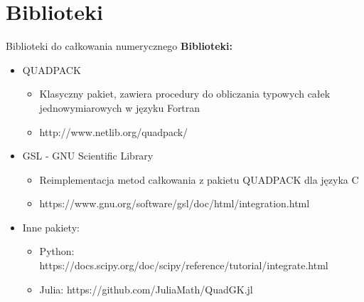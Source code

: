  \section{Biblioteki}
 
  \begin{frame}{Biblioteki do całkowania numerycznego}
      \textbf{Biblioteki:}
      
      \begin{itemize}
     	 \item QUADPACK
          	\begin{itemize}
          		\item Klasyczny pakiet, zawiera procedury do obliczania typowych całek jednowymiarowych w języku Fortran 
          		\item http://www.netlib.org/quadpack/
         \end{itemize}
         \item GSL - GNU Scientific Library
          	\begin{itemize}
          	\item Reimplementacja metod całkowania z pakietu QUADPACK dla języka C
          	\item https://www.gnu.org/software/gsl/doc/html/integration.html
          	\end{itemize}	
         \item Inne pakiety:
         \begin{itemize}
          	\item Python: https://docs.scipy.org/doc/scipy/reference/tutorial/integrate.html
          	\item Julia: https://github.com/JuliaMath/QuadGK.jl
          	\end{itemize}	 	
      \end{itemize}
  \end{frame}



























